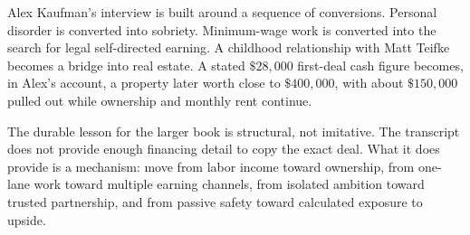 Alex Kaufman's interview is built around a sequence of conversions. Personal disorder is converted into sobriety. Minimum-wage work is converted into the search for legal self-directed earning. A childhood relationship with Matt Teifke becomes a bridge into real estate. A stated \(\$28{,}000\) first-deal cash figure becomes, in Alex's account, a property later worth close to \(\$400{,}000\), with about \(\$150{,}000\) pulled out while ownership and monthly rent continue.

The durable lesson for the larger book is structural, not imitative. The transcript does not provide enough financing detail to copy the exact deal. What it does provide is a mechanism: move from labor income toward ownership, from one-lane work toward multiple earning channels, from isolated ambition toward trusted partnership, and from passive safety toward calculated exposure to upside.